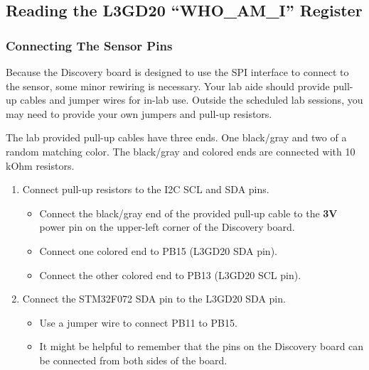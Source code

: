\documentclass[openany,11pt,fleqn]{book} %
\begin{document}
\subsection{Reading the L3GD20 ``WHO\_AM\_I'' Register}
\begin{exercise}
	\subsubsection{Connecting The Sensor Pins}
	Because the Discovery board is designed to use the SPI interface to connect to the sensor, some minor rewiring is necessary. Your lab aide should provide pull-up cables and jumper wires for in-lab use. Outside the scheduled lab sessions, you may need to provide your own jumpers and pull-up resistors. 
	
	The lab provided pull-up cables have three ends. One black/gray and two of a random matching color. The black/gray and colored ends are connected with 10 kOhm resistors. 
	
	\begin{enumerate}
	    \item Connect pull-up resistors to the I2C SCL and SDA pins. 
	    \begin{itemize}
	        \item Connect the black/gray end of the provided pull-up cable to the \textbf{3V} power pin on the upper-left corner of the Discovery board.
	        \item Connect one colored end to PB15 (L3GD20 SDA pin).
	        \item Connect the other colored end to PB13 (L3GD20 SCL pin).
	    \end{itemize}
	    \item Connect the STM32F072 SDA pin to the L3GD20 SDA pin.
	    \begin{itemize}
	        \item Use a jumper wire to connect PB11 to PB15.
	        \item It might be helpful to remember that the pins on the Discovery board can be connected from both sides of the board. 
	    \end{itemize}
	\end{enumerate}
\end{exercise}
\end{document}

